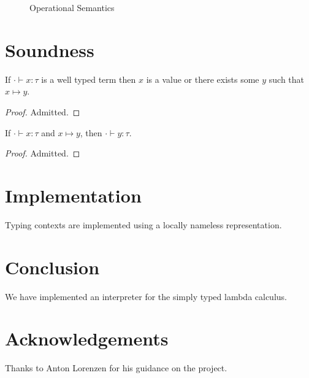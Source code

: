 \documentclass[]{acmart}
\begin{document}
  \begin{figure}
    \centering
    \caption{Operational Semantics}
    \label{fig:ops}
  \end{figure}


  \section{Soundness}

  \begin{theorem}[Progress]
    If $\cdot \vdash x : \tau$ is a well typed term then $x$ is a value or there
    exists some $y$ such that $x \mapsto y$.
  \end{theorem}

  \begin{proof}
    Admitted.
  \end{proof}

  \begin{theorem}[Preservation]
    If $\cdot \vdash x : \tau$ and $x \mapsto y$, then $\cdot \vdash y : \tau$.
  \end{theorem}

  \begin{proof}
    Admitted.
  \end{proof}

  \section{Implementation}

  Typing contexts are implemented using a locally nameless representation.

  \section{Conclusion}

  We have implemented an interpreter for the simply typed lambda calculus.

  \section{Acknowledgements}

  Thanks to Anton Lorenzen for his guidance on the project.

  \printbibliography
\end{document}
